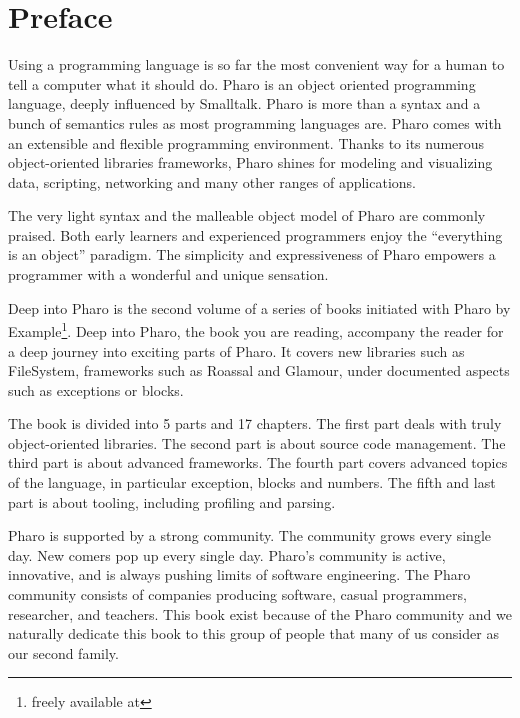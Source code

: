 \documentclass[a4paper,10pt,twoside]{book}
\begin{document}
	\sloppy
	\frontmatter
\fi
\chapter{Preface}

Using a programming language is so far the most convenient way for a human to tell  a computer what it should do. Pharo is an object oriented programming language, deeply influenced by Smalltalk. Pharo is more than a syntax and a bunch of semantics rules as most programming languages are. Pharo comes with an extensible and flexible programming environment. Thanks to its numerous object-oriented libraries frameworks, Pharo shines for modeling and visualizing data, scripting, networking and many other ranges of applications.

The very light syntax and the malleable object model of Pharo are commonly praised. Both early learners and experienced programmers enjoy the ``everything is an object'' paradigm. The simplicity and expressiveness of Pharo empowers a programmer with a wonderful and unique sensation. 

Deep into Pharo is the second volume of a series of books initiated with Pharo by Example\footnote{freely available at }. 
Deep into Pharo, the book you are reading, accompany the reader for a deep journey into exciting parts of Pharo. It covers new libraries such as FileSystem, frameworks such as Roassal and Glamour, under documented aspects such as exceptions or blocks. 

The book is divided into 5 parts and 17 chapters. The first part deals with truly object-oriented libraries. The second part is about source code management. The third part is about advanced frameworks. The fourth part covers advanced topics of the language, in particular exception, blocks and numbers. The fifth and last part is about tooling, including profiling and parsing.


Pharo is supported by a strong community. The community grows every single day. New comers pop up every single day. Pharo's community is active, innovative, and is always pushing limits of software engineering. The Pharo community consists of companies producing software, casual programmers, researcher, and teachers.
This book exist because of the Pharo community and we naturally dedicate this book to this group of people that many of us consider as our second family.
\end{document}
